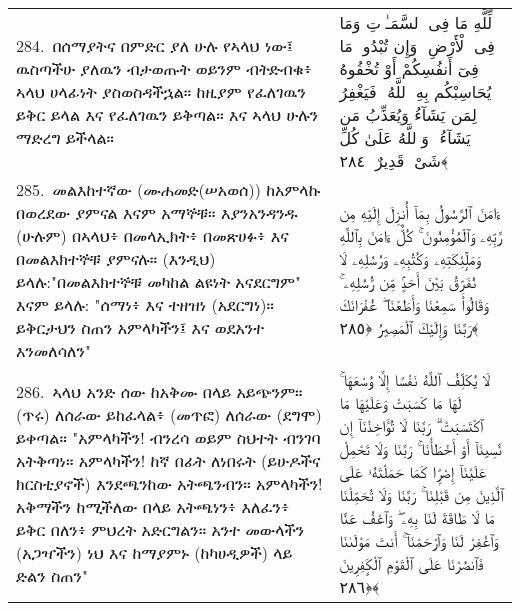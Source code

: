 \documentclass[11pt,a4paper,oneside]{article}%
\newcommand{\mytextarabic}[1]{\textarabic{ #1 \flushright}}
\begin{document}
\begin{longtable}{%
  @{}
    p{}
  @{~~~}
    p{}
    @{}
}
284.\ በሰማያትና በምድር ያለ ሁሉ የኣላህ ነው፤ ዉስጣችሁ ያለዉን ብታወጡት ወይንም ብትድብቁ፥ ኣላህ ሀላፊነት ያስወስዳችኋል። ከዚያም የፈለገዉን ይቅር ይላል እና የፈለገዉን ይቅጣል። እና ኣላህ ሁሉን ማድረግ ይችላል። &  \mytextarabic{لِّلَّهِ مَا فِى ٱلسَّمَـٰوَٟتِ وَمَا فِى ٱلْأَرْضِ ۗ وَإِن تُبْدُوا۟ مَا فِىٓ أَنفُسِكُمْ أَوْ تُخْفُوهُ يُحَاسِبْكُم بِهِ ٱللَّهُ ۖ فَيَغْفِرُ لِمَن يَشَآءُ وَيُعَذِّبُ مَن يَشَآءُ ۗ وَٱللَّهُ عَلَىٰ كُلِّ شَىْءٍۢ قَدِيرٌ ﴿٢٨٤﴾}\\
285.\ መልእከተኛው (ሙሐመድ(ሠአወሰ)) ከአምላኩ በወረደው ያምናል እናም አማኞቹ። እያንአንዳንዱ (ሁሉም) በኣላህ፥ በመላኢክት፥ በመጽሀፉ፥ እና በመልእክተኞቹ ያምናሉ። (እንዲህ) ይላሉ:"በመልእክተኞቹ መካከል ልዩነት አናደርግም" እናም ይላሉ: "ሰማነ፥ እና ተዘዝነ (አደርግነ)። ይቅርታህን ስጠን አምላካችን፤ እና ወደአንተ እንመለሳለን"  &  \mytextarabic{ءَامَنَ ٱلرَّسُولُ بِمَآ أُنزِلَ إِلَيْهِ مِن رَّبِّهِۦ وَٱلْمُؤْمِنُونَ ۚ كُلٌّ ءَامَنَ بِٱللَّهِ وَمَلَٟٓئِكَتِهِۦ وَكُتُبِهِۦ وَرُسُلِهِۦ لَا نُفَرِّقُ بَيْنَ أَحَدٍۢ مِّن رُّسُلِهِۦ ۚ وَقَالُوا۟ سَمِعْنَا وَأَطَعْنَا ۖ غُفْرَانَكَ رَبَّنَا وَإِلَيْكَ ٱلْمَصِيرُ ﴿٢٨٥﴾}\\
286.\ ኣላህ አንድ ሰው ከአቅሙ በላይ አይጭንም። (ጥሩ) ለሰራው ይከፈላል፥ (መጥፎ) ለሰራው (ደግሞ) ይቀጣል። "አምላካችን! ብንረሳ ወይም ስህተት ብንገባ አትቅጣነ። አምላካችን! ከኛ በፊት ለነበሩት (ይሁዶችና ክርስቲያኖች) እንደጫንከው አትጫንብን። አምላካችን! አቅማችን ከሚችለው በላይ አትጫነን፥ እለፈን፥ ይቅር በለን፥ ምህረት አድርግልን። አንተ መውላችን (አጋዣችን) ነህ እና ከማያምኑ (ከካሀዲዎች) ላይ ድልን ስጠን" &  \mytextarabic{لَا يُكَلِّفُ ٱللَّهُ نَفْسًا إِلَّا وُسْعَهَا ۚ لَهَا مَا كَسَبَتْ وَعَلَيْهَا مَا ٱكْتَسَبَتْ ۗ رَبَّنَا لَا تُؤَاخِذْنَآ إِن نَّسِينَآ أَوْ أَخْطَأْنَا ۚ رَبَّنَا وَلَا تَحْمِلْ عَلَيْنَآ إِصْرًۭا كَمَا حَمَلْتَهُۥ عَلَى ٱلَّذِينَ مِن قَبْلِنَا ۚ رَبَّنَا وَلَا تُحَمِّلْنَا مَا لَا طَاقَةَ لَنَا بِهِۦ ۖ وَٱعْفُ عَنَّا وَٱغْفِرْ لَنَا وَٱرْحَمْنَآ ۚ أَنتَ مَوْلَىٰنَا فَٱنصُرْنَا عَلَى ٱلْقَوْمِ ٱلْكَٟفِرِينَ ﴿٢٨٦﴾}\\

\end{longtable}
\clearpage





























\end{document}

